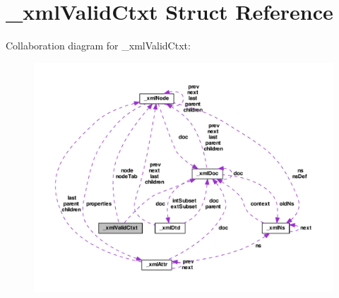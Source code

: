 \hypertarget{struct__xml_valid_ctxt}{\section{\-\_\-xml\-Valid\-Ctxt Struct Reference}
\label{struct__xml_valid_ctxt}
}


Collaboration diagram for \-\_\-xml\-Valid\-Ctxt\-:
\nopagebreak
\begin{figure}[H]
\begin{center}
\leavevmode
\includegraphics[width=350pt]{struct__xml_valid_ctxt__coll__graph}
\end{center}
\end{figure}
